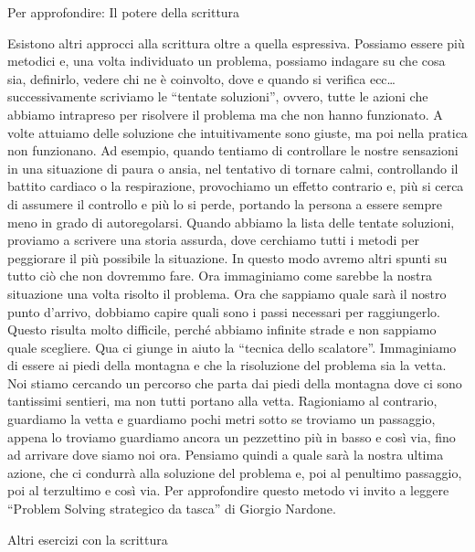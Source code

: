 \documentclass[12pt]{book} %
\begin{document}
Per approfondire: Il potere della scrittura

Esistono altri approcci alla scrittura oltre a quella espressiva. Possiamo essere più metodici e, una volta individuato
un problema, possiamo indagare su che cosa sia, definirlo, vedere chi ne è coinvolto, dove e quando si verifica ecc…
successivamente scriviamo le “tentate soluzioni”, ovvero, tutte le azioni che abbiamo intrapreso per risolvere il
problema ma che non hanno funzionato. A volte attuiamo delle soluzione che intuitivamente sono giuste, ma
poi nella pratica non funzionano. Ad esempio, quando tentiamo di controllare le nostre sensazioni in una situazione di
paura o ansia, nel tentativo di tornare calmi, controllando il battito cardiaco o la respirazione, provochiamo un effetto
contrario e, più si cerca di assumere il controllo e più lo si perde, portando la persona a essere sempre meno in grado
di autoregolarsi. Quando abbiamo la lista delle tentate soluzioni, proviamo a scrivere una storia assurda, dove
cerchiamo tutti i metodi per peggiorare il più possibile la situazione. In questo modo avremo altri spunti su tutto ciò
che non dovremmo fare. Ora immaginiamo come sarebbe la nostra
situazione una volta risolto il problema. Ora che sappiamo quale sarà il nostro punto d'arrivo, dobbiamo capire quali sono i passi necessari per
raggiungerlo. Questo risulta molto difficile, perché abbiamo infinite strade e non sappiamo quale scegliere. Qua ci
giunge in aiuto la “tecnica dello scalatore”. Immaginiamo di essere ai piedi della montagna e che la risoluzione del
problema sia la vetta. Noi stiamo cercando un percorso che parta dai piedi della montagna dove ci sono tantissimi
sentieri, ma non tutti portano alla vetta. Ragioniamo al contrario, guardiamo la vetta e guardiamo pochi metri sotto se
troviamo un passaggio, appena lo troviamo guardiamo ancora un pezzettino più in basso e così via, fino ad arrivare dove
siamo noi ora. Pensiamo quindi a quale sarà la nostra ultima azione, che ci condurrà alla soluzione del
problema e, poi al penultimo passaggio, poi al terzultimo e così via. 
Per approfondire questo metodo vi invito a leggere “Problem Solving strategico da
tasca” di Giorgio
Nardone.

Altri esercizi con la scrittura
\end{document}
